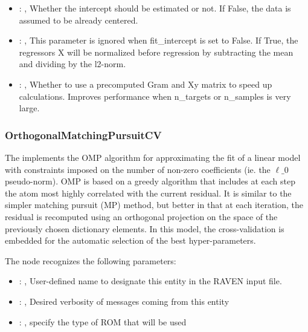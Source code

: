 \begin{itemize}
    \item {}: , 
      Whether the intercept should be estimated or not. If False,
      the data is assumed to be already centered.

    \item {}: , 
      This parameter is ignored when fit\_intercept is set to False. If True,
      the regressors X will be normalized before regression by subtracting the mean and
      dividing by the l2-norm.

    \item {}: , 
      Whether to use a precomputed Gram and Xy matrix to speed up calculations.
      Improves performance when n\_targets or n\_samples is very large.
  \end{itemize}


\subsubsection{OrthogonalMatchingPursuitCV}
  The                          implements the OMP algorithm for
  approximating the fit of a                         linear model with constraints imposed on the
  number of non-zero                         coefficients (ie. the $\ell\_0$ pseudo-norm). OMP is
  based on a greedy                         algorithm that includes at each step the atom most
  highly correlated                         with the current residual. It is similar to the simpler
  matching                         pursuit (MP) method, but better in that at each iteration, the
  residual                         is recomputed using an orthogonal projection on the space of the
  previously chosen dictionary elements.                         In this model, the cross-validation
  is embedded for the automatic selection                         of the best hyper-parameters.

  The  node recognizes the following parameters:
    \begin{itemize}
      \item {}: , 
        User-defined name to designate this entity in the RAVEN input file.
      \item {}: , 
        Desired verbosity of messages coming from this entity
      \item {}: , 
        specify the type of ROM that will be used
  \end{itemize}

